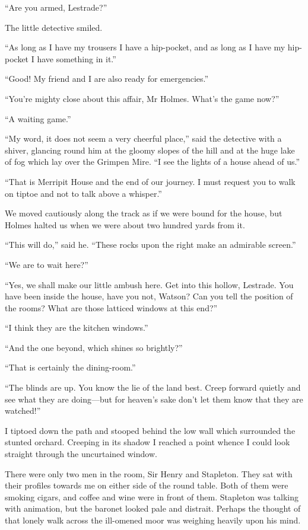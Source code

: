 \documentclass[paper=5.5in:8.5in,BCOR=7mm,twoside,DIV=calc,12pt,usegeometry,openany,chapterprefix,endperiod]{scrbook} %
\begin{document}
\enquote{Are you armed, Lestrade?}

The little detective smiled.

\enquote{As long as I have my trousers I have a hip-pocket, and as long as I have my hip-pocket I have something in it.}

\enquote{Good! My friend and I are also ready for emergencies.}

\enquote{You're mighty close about this affair, Mr Holmes. What's the game now?}

\enquote{A waiting game.}

\enquote{My word, it does not seem a very cheerful place,} said the detective with a shiver, glancing round him at the gloomy slopes of the hill and at the huge lake of fog which lay over the Grimpen Mire. \enquote{I see the lights of a house ahead of us.}

\enquote{That is Merripit House and the end of our journey. I must request you to walk on tiptoe and not to talk above a whisper.}

We moved cautiously along the track as if we were bound for the house, but Holmes halted us when we were about two hundred yards from it.

\enquote{This will do,} said he. \enquote{These rocks upon the right make an admirable screen.}

\enquote{We are to wait here?}

\enquote{Yes, we shall make our little ambush here. Get into this hollow, Lestrade. You have been inside the house, have you not, Watson? Can you tell the position of the rooms? What are those latticed windows at this end?}

\enquote{I think they are the kitchen windows.}

\enquote{And the one beyond, which shines so brightly?}

\enquote{That is certainly the dining-room.}

\enquote{The blinds are up. You know the lie of the land best. Creep forward quietly and see what they are doing\nobreakdash---but for heaven's sake don't let them know that they are watched!}

I tiptoed down the path and stooped behind the low wall which surrounded the stunted orchard. Creeping in its shadow I reached a point whence I could look straight through the uncurtained window.

There were only two men in the room, Sir Henry and Stapleton. They sat with their profiles towards me on either side of the round table. Both of them were smoking cigars, and coffee and wine were in front of them. Stapleton was talking with animation, but the baronet looked pale and distrait. Perhaps the thought of that lonely walk across the ill-omened moor was weighing heavily upon his mind.
\end{document}
